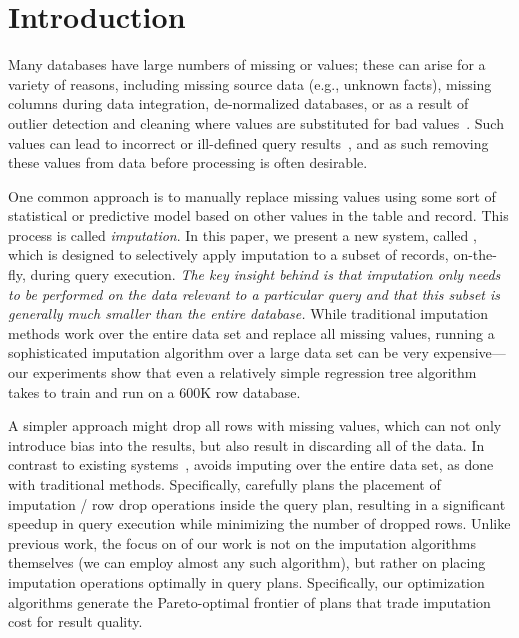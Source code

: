 \section{Introduction}

Many databases have large numbers of missing or \nullv{} values;  these can arise for a variety of reasons, including missing source data (e.g., unknown facts),
missing columns during data integration, de-normalized databases, or as a result of outlier detection and cleaning where \nullv{} values are substituted for
bad values~\cite{kim2003}.  Such \nullv{} values can lead to incorrect or ill-defined query results~\cite{rubin1976}, and as such removing these values from data
before processing is often desirable.

One common approach is to manually replace missing values using some sort of statistical or predictive model based on other values in the table and record.
This process is called \emph{imputation}.
In this paper, we present a new system, called \ProjectName{}, which is designed to selectively apply imputation to a subset of records, on-the-fly, during query execution.  \emph{The key insight behind \ProjectName{} is that imputation
only needs to be performed on the data relevant to a particular query and
that this subset is generally much smaller than the entire database.}  
While traditional imputation methods work over the entire data set and replace all missing values, running a sophisticated imputation algorithm over a large data set can be very expensive---our experiments show that even a relatively simple regression tree algorithm takes \acsbaseresulthours{} to train and run
on a 600K row database.

A simpler approach might drop all rows with missing values, which can not only introduce bias into the results, but also result in discarding all of the data.
In contrast to existing systems~\cite{burgette2010multiple,akande2015empirical}, \ProjectName{} avoids imputing over the entire data set, as done with traditional methods. Specifically, \ProjectName{}
carefully plans the placement of imputation / row drop operations inside the query plan, resulting in a 
significant speedup in query execution while minimizing the number of dropped rows. Unlike previous work, the focus on of our work is not on the imputation algorithms themselves (we can employ almost any such algorithm), but rather on placing imputation operations
optimally in query plans.   Specifically, our optimization algorithms generate the Pareto-optimal frontier of plans that trade imputation cost for result quality.

